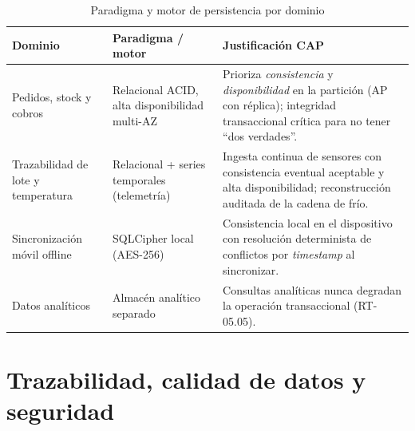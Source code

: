 \begin{table}[htbp]
\centering
\small
\caption{Paradigma y motor de persistencia por dominio}
\label{tab:persistencia}
\begin{tabularx}{\textwidth}{@{}L{4.4cm}L{4.4cm}X@{}}
\toprule
\textbf{Dominio} & \textbf{Paradigma / motor} & \textbf{Justificación CAP} \\
\midrule
Pedidos, stock y cobros &
Relacional ACID, alta disponibilidad multi-AZ &
Prioriza \emph{consistencia} y \emph{disponibilidad} en la partición (AP con réplica);
integridad transaccional crítica para no tener ``dos verdades''. \\
\addlinespace
Trazabilidad de lote y temperatura &
Relacional + series temporales (telemetría) &
Ingesta continua de sensores con consistencia eventual aceptable y alta disponibilidad;
reconstrucción auditada de la cadena de frío. \\
\addlinespace
Sincronización móvil offline &
SQLCipher local (AES-256) &
Consistencia local en el dispositivo con resolución determinista de conflictos por
\emph{timestamp} al sincronizar. \\
\addlinespace
Datos analíticos &
Almacén analítico separado &
Consultas analíticas nunca degradan la operación transaccional (RT-05.05). \\
\bottomrule
\end{tabularx}
\end{table}

\section{Trazabilidad, calidad de datos y seguridad}

